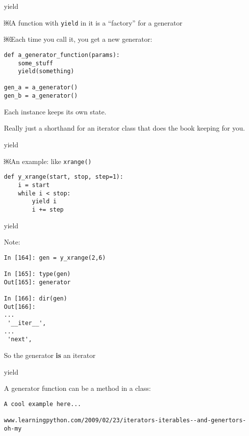 \documentclass{beamer}
\begin{document}
\begin{frame}[fragile]{yield}

\Large{￼A function with \verb|yield| in it is a ``factory'' for a generator}

\Large{￼Each time you call it, you get a new generator:}
 
\begin{verbatim}
def a_generator_function(params):
    some_stuff
    yield(something)

gen_a = a_generator()
gen_b = a_generator()
\end{verbatim}

\vfill
\Large{ Each instance keeps its own state. }

\vfill
\Large{ Really just a shorthand for an iterator class that does the book keeping for you.}

\end{frame}

\begin{frame}[fragile]{yield}

\Large{￼An example: like \verb|xrange()|}

\begin{verbatim}
def y_xrange(start, stop, step=1):
    i = start
    while i < stop:
        yield i
        i += step
\end{verbatim}

\end{frame}

\begin{frame}[fragile]{yield}

{\Large Note:}

\begin{verbatim}
In [164]: gen = y_xrange(2,6)

In [165]: type(gen)
Out[165]: generator

In [166]: dir(gen)
Out[166]: 
...
 '__iter__',
...
 'next',
\end{verbatim}
{\Large So the generator {\bf is} an iterator}
\end{frame}

\begin{frame}[fragile]{yield}

{\Large A generator function can be a method in a class:}

\begin{verbatim}
A cool example here...

www.learningpython.com/2009/02/23/iterators-iterables--and-genertors-oh-my
\end{verbatim}

\end{frame}
\end{document}
